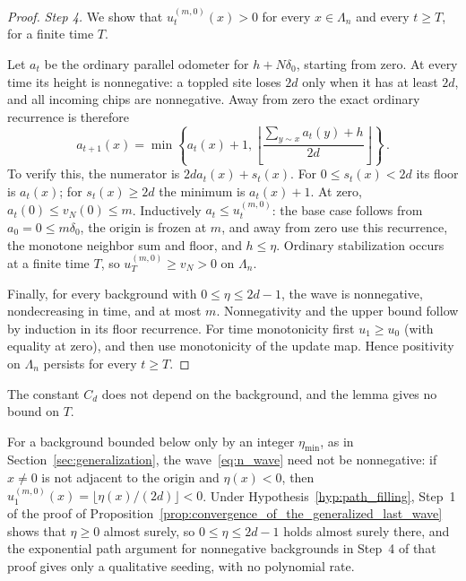 \documentclass[12pt]{amsart}
\begin{document}
\begin{proof}
\emph{Step 4.} We show that $u_t^{(m,0)}(x)>0$ for every $x\in\Lambda_n$ and every $t\geq T$, for a finite time $T$.

Let $a_t$ be the ordinary parallel odometer for $h+N\delta_0$, starting from zero. At every time its height is nonnegative: a toppled site loses $2d$ only when it has at least $2d$, and all incoming chips are nonnegative. Away from zero the exact ordinary recurrence is therefore
\begin{equation*}
 a_{t+1}(x)=\min\left\{a_t(x)+1,
 \left\lfloor\frac{\sum_{y\sim x}a_t(y)+h}{2d}\right\rfloor\right\}\,.
\end{equation*}
To verify this, the numerator is $2da_t(x)+s_t(x)$. For $0\leq s_t(x)<2d$ its floor is $a_t(x)$; for $s_t(x)\geq2d$ the minimum is $a_t(x)+1$. At zero, $a_t(0)\leq v_N(0)\leq m$. Inductively $a_t\leq u_t^{(m,0)}$: the base case follows from $a_0=0\leq m\delta_0$, the origin is frozen at $m$, and away from zero use this recurrence, the monotone neighbor sum and floor, and $h\leq\eta$. Ordinary stabilization occurs at a finite time $T$, so $u_T^{(m,0)}\geq v_N>0$ on $\Lambda_n$.

Finally, for every background with $0\leq\eta\leq2d-1$, the wave is nonnegative, nondecreasing in time, and at most $m$. Nonnegativity and the upper bound follow by induction in its floor recurrence. For time monotonicity first $u_1\geq u_0$ (with equality at zero), and then use monotonicity of the update map. Hence positivity on $\Lambda_n$ persists for every $t\geq T$.
\end{proof}

The constant $C_d$ does not depend on the background, and the lemma gives no bound on $T$.

For a background bounded below only by an integer $\eta_{\min}$, as in Section~\ref{sec:generalization}, the wave~\eqref{eq:n_wave} need not be nonnegative: if $x\neq0$ is not adjacent to the origin and $\eta(x)<0$, then $u_1^{(m,0)}(x)=\lfloor\eta(x)/(2d)\rfloor<0$. Under Hypothesis~\ref{hyp:path_filling}, Step~1 of the proof of Proposition~\ref{prop:convergence_of_the_generalized_last_wave} shows that $\eta\geq0$ almost surely, so $0\leq\eta\leq2d-1$ holds almost surely there, and the exponential path argument for nonnegative backgrounds in Step~4 of that proof gives only a qualitative seeding, with no polynomial rate.
\end{document}
